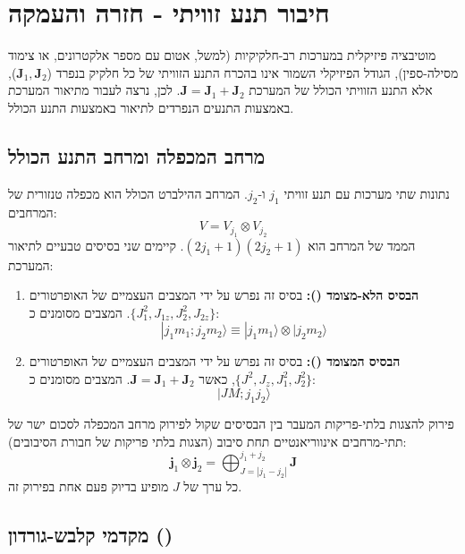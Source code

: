 

\section{חיבור תנע זוויתי - חזרה והעמקה}

\begin{mainbox}{מוטיבציה פיזיקלית}
במערכות רב-חלקיקיות (למשל, אטום עם מספר אלקטרונים, או צימוד מסילה-ספין), הגודל הפיזיקלי השמור אינו בהכרח התנע הזוויתי של כל חלקיק בנפרד ($\mathbf{J}_1, \mathbf{J}_2$), אלא התנע הזוויתי הכולל של המערכת $\mathbf{J} = \mathbf{J}_1 + \mathbf{J}_2$. לכן, נרצה לעבור מתיאור המערכת באמצעות התנעים הנפרדים לתיאור באמצעות התנע הכולל.
\end{mainbox}

\subsection{מרחב המכפלה ומרחב התנע הכולל}

נתונות שתי מערכות עם תנע זוויתי $j_1$ ו-$j_2$. המרחב ההילברט הכולל הוא מכפלה טנזורית של המרחבים:
\[
V = V_{j_1} \otimes V_{j_2}
\]
הממד של המרחב הוא $(2j_1+1)(2j_2+1)$. קיימים שני בסיסים טבעיים לתיאור המערכת:

\begin{enumerate}
    \item \textbf{הבסיס הלא-מצומד ():}
    בסיס זה נפרש על ידי המצבים העצמיים של האופרטורים $\{J_1^2, J_{1z}, J_2^2, J_{2z}\}$. המצבים מסומנים כ:
    \[
    |j_1 m_1; j_2 m_2\rangle \equiv |j_1 m_1\rangle \otimes |j_2 m_2\rangle
    \]
    
    \item \textbf{הבסיס המצומד ():}
    בסיס זה נפרש על ידי המצבים העצמיים של האופרטורים $\{J^2, J_z, J_1^2, J_2^2\}$, כאשר $\mathbf{J} = \mathbf{J}_1 + \mathbf{J}_2$. המצבים מסומנים כ:
    \[
    |J M; j_1 j_2\rangle
    \]
\end{enumerate}

\begin{theorembox}{פירוק להצגות בלתי-פריקות}
המעבר בין הבסיסים שקול לפירוק מרחב המכפלה לסכום ישר של תתי-מרחבים אינווריאנטיים תחת סיבוב (הצגות בלתי פריקות של חבורת הסיבובים):
\[
\mathbf{j}_1 \otimes \mathbf{j}_2 = \bigoplus_{J=|j_1-j_2|}^{j_1+j_2} \mathbf{J}
\]
כל ערך של $J$ מופיע בדיוק פעם אחת בפירוק זה.
\end{theorembox}

\subsection{מקדמי קלבש-גורדון ()}

